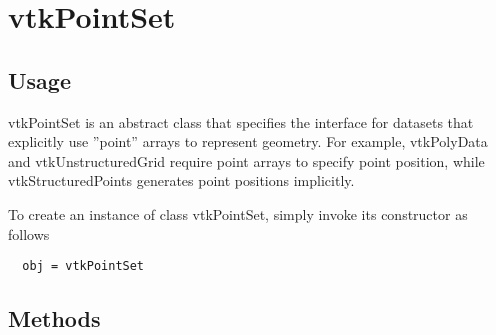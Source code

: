 \section{vtkPointSet}

\subsection{Usage}

 vtkPointSet is an abstract class that specifies the interface for
 datasets that explicitly use ''point'' arrays to represent geometry.
 For example, vtkPolyData and vtkUnstructuredGrid require point arrays
 to specify point position, while vtkStructuredPoints generates point
 positions implicitly.

To create an instance of class vtkPointSet, simply
invoke its constructor as follows
\begin{verbatim}
  obj = vtkPointSet
\end{verbatim}
\subsection{Methods}

